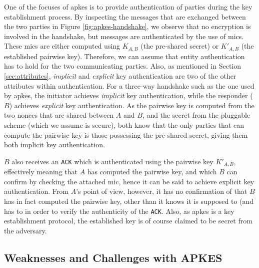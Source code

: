 One of the focuses of \gls{apkes} is to provide authentication of parties during the key establishment process. By inspecting the messages that are exchanged between the two parties in Figure \ref{fig:apkes-handshake}, we observe that no encryption is involved in the handshake, but messages are authenticated by the use of \gls{mic}s. These \gls{mic}s are either computed using $K_{A,B}$ (the pre-shared secret) or $K'_{A,B}$ (the established pairwise key). Therefore, we can assume that entity authentication has to hold for the two communicating parties. Also, as mentioned in Section \ref{sec:attributes}, \emph{implicit} and \emph{explicit} key authentication are two of the other attributes within authentication. For a three-way handshake such as the one used by \gls{apkes}, the initiator achieves \emph{implicit} key authentication, while the responder ($B$) achieves \emph{explicit} key authentication. As the pairwise key is computed from the two nonces that are shared between $A$ and $B$, and the secret from the pluggable scheme (which we assume is secure), both know that the only parties that can compute the pairwise key is those possessing the pre-shared secret, giving them both implicit key authentication. 

$B$ also receives an \texttt{ACK} which is authenticated using the pairwise key $K'_{A,B}$, effectively meaning that $A$ has computed the pairwise key, and which $B$ can confirm by checking the attached \gls{mic}, hence it can be said to achieve explicit key authentication. From $A$'s point of view, however, it has no confirmation of that $B$ has in fact computed the pairwise key, other than it knows it is supposed to (and has to in order to verify the authenticity of the \texttt{ACK}. Also, as \gls{apkes} is a key establishment protocol, the established key is of course claimed to be secret from the adversary.

\subsection{Weaknesses and Challenges with APKES}
\label{subsec:apkes-weakness}

